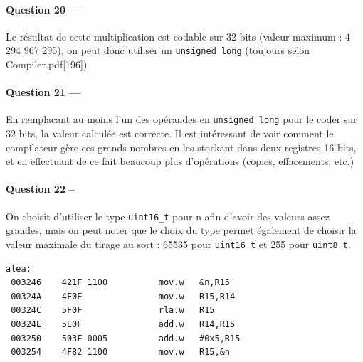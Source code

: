 \documentclass[a4paper,11pt,article]{memoir}
\begin{document}
\paragraph{Question 20 ---}  Le résultat de cette multiplication est codable sur 32 bits (valeur maximum : 4 294 967 295), on peut donc utiliser un \verb|unsigned long| (toujours selon Compiler.pdf[196])

\paragraph{Question 21 ---}  En remplacant au moins l'un des opérandes en \verb|unsigned long| pour le coder sur 32 bits, la valeur calculée est correcte. Il est intéressant de voir comment le compilateur gère ces grands nombres en les stockant dans deux registres 16 bits, et en effectuant de ce fait beaucoup plus d'opérations (copies, effacements, etc.)

\paragraph{Question 22 --}  On choisit d'utiliser le type \verb|uint16_t| pour n afin d'avoir des valeurs assez grandes, mais on peut noter que le choix du type permet également de choisir la valeur maximale du tirage au sort : 65535 pour \verb|uint16_t| et 255 pour \verb|uint8_t|.

\begin{verbatim}
alea:
 003246    421F 1100          mov.w   &n,R15
 00324A    4F0E               mov.w   R15,R14
 00324C    5F0F               rla.w   R15
 00324E    5E0F               add.w   R14,R15
 003250    503F 0005          add.w   #0x5,R15
 003254    4F82 1100          mov.w   R15,&n
\end{verbatim}
\end{document}

